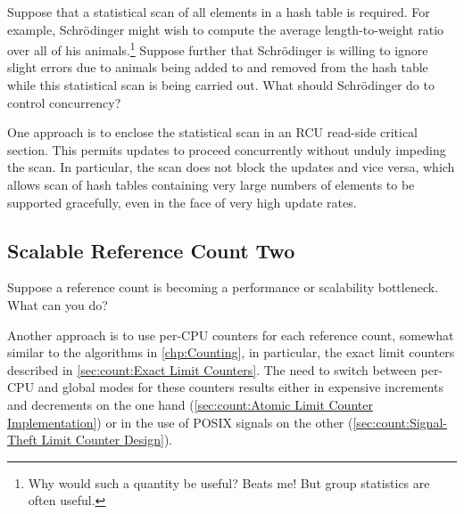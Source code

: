 Suppose that a statistical scan of all elements in a hash table is
required.
For example, Schr\"odinger might wish to compute the average
length-to-weight ratio over all of his animals.\footnote{
	Why would such a quantity be useful?
	Beats me!
	But group statistics are often useful.}
Suppose further that Schr\"odinger is willing to ignore slight
errors due to animals being added to and removed from the hash
table while this statistical scan is being carried out.
What should Schr\"odinger do to control concurrency?

One approach is to enclose the statistical scan in an RCU read-side
critical section.
This permits updates to proceed concurrently without unduly impeding
the scan.
In particular, the scan does not block the updates and vice versa,
which allows scan of hash tables containing very large numbers of
elements to be supported gracefully, even in the face of very high
update rates.

\QuickQuizEnd

\subsection{Scalable Reference Count Two}
\label{sec:together:Scalable Reference Count Two}

Suppose a reference count is becoming a performance or scalability
bottleneck.
What can you do?

Another approach is to use per-CPU counters for each reference count,
somewhat similar to the algorithms in \cref{chp:Counting}, in particular,
the exact limit counters described in
\cref{sec:count:Exact Limit Counters}.
The need to switch between per-CPU and global modes for these counters
results either in expensive increments and decrements on the one hand
(\cref{sec:count:Atomic Limit Counter Implementation})
or in the use of POSIX signals on the other
(\cref{sec:count:Signal-Theft Limit Counter Design}).

